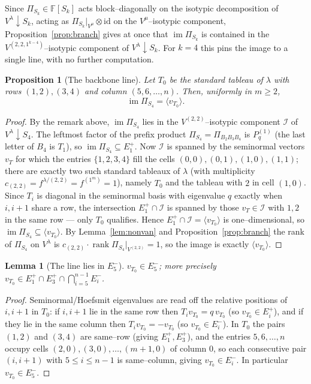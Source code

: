 \documentclass[11pt]{article}
\newtheorem{lemma}[theorem]{Lemma}
\newtheorem{proposition}[theorem]{Proposition}
\theoremstyle{definition}
\DeclareMathOperator{\rank}{rank}
\DeclareMathOperator{\im}{im}
\newcommand{\Pq}{P_{q}}
\newcommand{\la}{\lambda}
\newcommand{\Vl}{V^{\la}}
\newcommand{\Ep}[1]{E^{+}_{#1}}
\newcommand{\Em}[1]{E^{-}_{#1}}
\begin{document}
Since $\Pi_{S_k}\in\mathbb{F}[S_k]$ acts block--diagonally on the isotypic decomposition
of $\Vl\!\downarrow\! S_k$, acting as $\Pi_{S_k}\big|_{V^\mu}\otimes\mathrm{id}$ on the
$V^\mu$--isotypic component, Proposition~\ref{prop:branch} gives at once that $\im\Pi_{S_k}$
is contained in the $V^{(2,2,1^{k-4})}$--isotypic component of $\Vl\!\downarrow\! S_k$. For
$k=4$ this pins the image to a single line, with no further computation.

\begin{proposition}[The backbone line]\label{prop:line}
Let $T_0$ be the standard tableau of $\la$ with rows $(1,2),(3,4)$ and column
$(5,6,\dots,n)$. Then, uniformly in $m\ge2$,
\[
\im\Pi_{S_4}=\langle v_{T_0}\rangle .
\]
\end{proposition}

\begin{proof}
By the remark above, $\im\Pi_{S_4}$ lies in the $V^{(2,2)}$--isotypic component
$\mathcal I$ of $\Vl\!\downarrow\! S_4$. The leftmost factor of the prefix product
$\Pi_{S_4}=\Pi_{B_2B_3B_4}$ is $\Pq^{(1)}$ (the last letter of $B_4$ is $T_1$), so
$\im\Pi_{S_4}\subseteq\Ep1$. Now $\mathcal I$ is spanned by the seminormal vectors $v_T$
for which the entries $\{1,2,3,4\}$ fill the cells $(0,0),(0,1),(1,0),(1,1)$; there are
exactly two such standard tableaux of $\la$ (with multiplicity $c_{(2,2)}=f^{\la/(2,2)}
=f^{(1^m)}=1$), namely $T_0$ and the tableau with $2$ in cell $(1,0)$. Since $T_i$ is
diagonal in the seminormal basis with eigenvalue $q$ exactly when $i,i+1$ share a row, the
intersection $\Ep1\cap\mathcal I$ is spanned by those $v_T\in\mathcal I$ with $1,2$ in the
same row --- only $T_0$ qualifies. Hence $\Ep1\cap\mathcal I=\langle v_{T_0}\rangle$ is
one--dimensional, so $\im\Pi_{S_4}\subseteq\langle v_{T_0}\rangle$. By
Lemma~\ref{lem:nonvan} and Proposition~\ref{prop:branch} the rank of $\Pi_{S_4}$ on $\Vl$
is $c_{(2,2)}\cdot\rank\Pi_{S_4}|_{V^{(2,2)}}=1$, so the image is exactly $\langle
v_{T_0}\rangle$.
\end{proof}

\begin{lemma}[The line lies in $\Em5$]\label{lem:inE5}
$v_{T_0}\in\Em5$; more precisely $v_{T_0}\in\Ep1\cap\Ep3\cap\bigcap_{i=5}^{n-1}\Em i$.
\end{lemma}

\begin{proof}
Seminormal/Hoefsmit eigenvalues are read off the relative positions of $i,i+1$ in $T_0$:
if $i,i+1$ lie in the same row then $T_iv_{T_0}=q\,v_{T_0}$ (so $v_{T_0}\in\Ep i$), and if
they lie in the same column then $T_iv_{T_0}=-v_{T_0}$ (so $v_{T_0}\in\Em i$). In $T_0$ the
pairs $(1,2)$ and $(3,4)$ are same--row (giving $\Ep1,\Ep3$), and the entries
$5,6,\dots,n$ occupy cells $(2,0),(3,0),\dots,(m+1,0)$ of column $0$, so each consecutive
pair $(i,i+1)$ with $5\le i\le n-1$ is same--column, giving $v_{T_0}\in\Em i$. In
particular $v_{T_0}\in\Em5$.
\end{proof}
\end{document}
